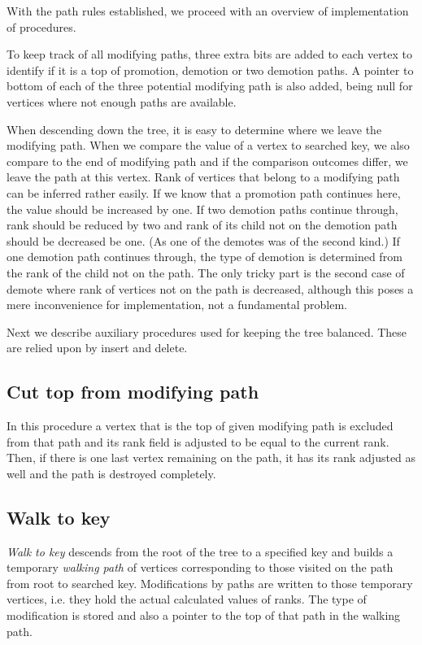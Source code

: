 With the path rules established, we proceed with an overview of implementation of procedures.

To keep track of all modifying paths, three extra bits are added to each vertex to identify if it is a top of promotion, demotion or two demotion paths. A pointer to bottom of each of the three potential modifying path is also added, being null for vertices where not enough paths are available.

When descending down the tree, it is easy to determine where we leave the modifying path. 
When we compare the value of a vertex to searched key, we also compare to the end of modifying path and if the comparison outcomes differ, we leave the path at this vertex. 
Rank of vertices that belong to a modifying path can be inferred rather easily. 
If we know that a promotion path continues here, the value should be increased by one. 
If two demotion paths continue through, rank should be reduced by two and rank of its child not on the demotion path should be decreased be one. (As one of the demotes was of the second kind.)
If one demotion path continues through, the type of demotion is determined from the rank of the child not on the path. 
The only tricky part is the second case of demote where rank of vertices not on the path is decreased, although this poses a mere inconvenience for implementation, not a fundamental problem.

Next we describe auxiliary procedures used for keeping the tree balanced. These are relied upon by insert and delete.

\subsection{Cut top from modifying path}

In this procedure a vertex that is the top of given modifying path is excluded from that path and its rank field is adjusted to be equal to the current rank. Then, if there is one last vertex remaining on the path, it has its rank adjusted as well and the path is destroyed completely.

\subsection{Walk to key}

\emph{Walk to key} descends from the root of the tree to a specified key and builds a temporary {\em walking path} of vertices corresponding to those visited on the path from root to searched key. Modifications by paths are written to those temporary vertices, i.e. they hold the actual calculated values of ranks. The type of modification is stored and also a pointer to the top of that path in the walking path.

